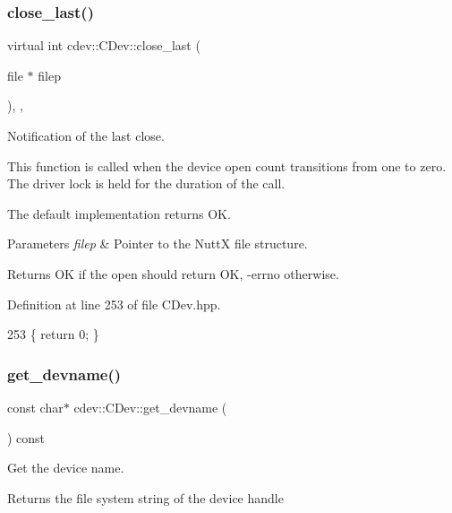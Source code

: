 \subsubsection{\texorpdfstring{close\+\_\+last()}{close\_last()}}
{\footnotesize\ttfamily virtual int cdev\+::\+C\+Dev\+::close\+\_\+last (\begin{DoxyParamCaption}\item[{file $\ast$}]{filep }\end{DoxyParamCaption})\hspace{0.3cm}{\ttfamily [inline]}, {\ttfamily [protected]}, {\ttfamily [virtual]}}

Notification of the last close.

This function is called when the device open count transitions from one to zero. The driver lock is held for the duration of the call.

The default implementation returns OK.


\begin{DoxyParams}{Parameters}
{\em filep} & Pointer to the NuttX file structure. \\
\hline
\end{DoxyParams}
\begin{DoxyReturn}{Returns}
OK if the open should return OK, -\/errno otherwise. 
\end{DoxyReturn}


Definition at line 253 of file C\+Dev.\+hpp.


\begin{DoxyCode}
253 \{ \textcolor{keywordflow}{return} 0; \}
\end{DoxyCode}
\mbox{\label{classcdev_1_1CDev_a0bc1072e967a90dfac04a1227f200f6f}} 
\subsubsection{\texorpdfstring{get\+\_\+devname()}{get\_devname()}}
{\footnotesize\ttfamily const char$\ast$ cdev\+::\+C\+Dev\+::get\+\_\+devname (\begin{DoxyParamCaption}{ }\end{DoxyParamCaption}) const\hspace{0.3cm}{\ttfamily [inline]}}

Get the device name.

\begin{DoxyReturn}{Returns}
the file system string of the device handle 
\end{DoxyReturn}


